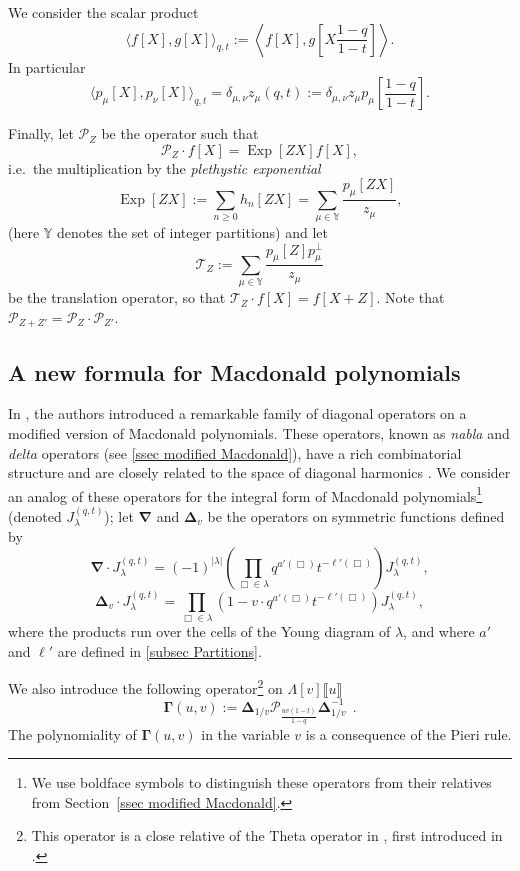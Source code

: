 \documentclass[12pt]{amsart}
\theoremstyle{remark}
\newcommand{\nablaJ}{\boldsymbol{\nabla}}
\newcommand{\DeltaJ}{\boldsymbol{\Delta}}
\newcommand{\GammaJ}{\boldsymbol{\Gamma}}
\newcommand{\Pop}{\mathcal{P}}
\newcommand{\Top}{\mathcal{T}}
\DeclareMathOperator{\Exp}{Exp}
\begin{document}
We consider the scalar product
$$\langle f[X],g[X]\rangle_{q,t}:=\left\langle f[X],g\left[X\frac{1-q}{1-t}\right]\right\rangle.$$
In particular 
\begin{equation} \label{eq:qtzlambda_def}
\langle p_\mu[X],p_\nu[X]\rangle_{q,t}=\delta_{\mu,\nu}z_\mu(q,t):=\delta_{\mu,\nu} z_\mu p_\mu\left[\frac{1-q}{1-t}\right].
\end{equation}

Finally, let $\Pop_Z$ be the operator such that 
$$\Pop_Z\cdot f[X]=\Exp[ZX]f[X],$$ i.e.\ the multiplication by the \emph{plethystic exponential} 
$$\Exp[ZX]:=\sum_{n\geq 0}h_n[ZX]=\sum_{\mu\in\mathbb Y}\frac{p_\mu[ZX]}{z_\mu},$$ (here $\mathbb{Y}$ denotes the set of integer partitions) and let
$$\Top_{Z}:=\sum_{\mu \in \mathbb{Y}}\frac{p_\mu[Z]p_\mu^\perp}{z_\mu}$$ be the translation operator, so that $\Top_Z\cdot f[X]=f[X+Z]$. Note that 
$\Pop_{Z+Z'}=\Pop_Z\cdot\Pop_{Z'}$.

\subsection{A new formula for Macdonald polynomials}
In \cite{BergeronGarsiaHaimanTesler1999}, the authors introduced a remarkable family of diagonal operators on a modified version of Macdonald polynomials. These operators, known as \emph{nabla} and \emph{delta} operators (see \cref{ssec modified Macdonald}), have a rich combinatorial structure and are closely related to the space of diagonal harmonics \cite{Haiman02, CarlssonMellit2018,HaglundRemmelWilson2018,DAdderioMellit2022}. 
We consider an analog of these operators for the integral form of Macdonald polynomials\footnote{We use boldface symbols to distinguish these operators from their relatives from Section~\ref{ssec modified Macdonald}.} (denoted $J^{(q,t)}_\lambda$); let $\nablaJ$ and $\DeltaJ_v$ be the operators on symmetric functions defined by
\begin{equation}
  \nablaJ\cdot J^{(q,t)}_\lambda\! =\! (-1)^{|\lambda|}\left(\prod_{\Box\in\lambda}q^{a'(\Box)}t^{-\ell'(\Box)}\right) J^{(q,t)}_\lambda,  \label{eq nablaJ}
\end{equation}
$$\DeltaJ_v\cdot J^{(q,t)}_\lambda\! =\! \prod_{\Box\in\lambda}\left(1-v\cdot q^{a'(\Box)}t^{-\ell'(\Box)}\right) J^{(q,t)}_\lambda,$$
where the products run over the cells of the Young diagram of  $\lambda$, and where $a'$ and $\ell'$ are defined in \cref{subsec Partitions}.

We also introduce the following operator\footnote{This operator is a close relative of the Theta operator in \cite{DAdderioRomero2023}, first introduced in \cite{DAdderioIraciVWyngaerd21}.} on $\Lambda[v]\llbracket u\rrbracket$
$$\GammaJ(u,v):=\DeltaJ_{1/v} \mathcal{P}_{\frac{uv(1-t)}{1-q}}
\DeltaJ_{1/v}^{-1}\ \ .$$ 
The polynomiality of $\GammaJ(u,v)$ in the variable $v$ is a consequence of the Pieri rule.
\end{document}
